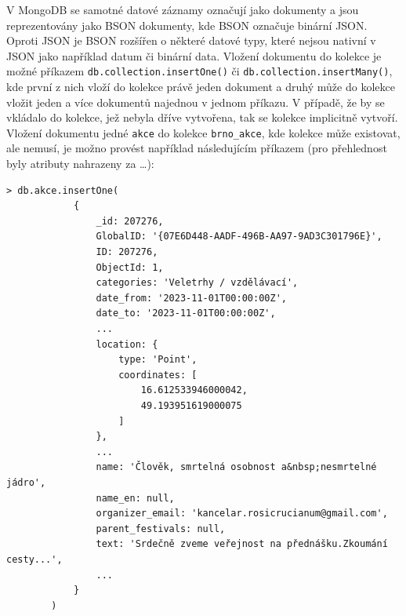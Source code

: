 \documentclass[a4paper, 11pt]{article}
\begin{document}
    V MongoDB se samotné datové záznamy označují jako dokumenty a jsou reprezentovány jako BSON dokumenty, kde BSON označuje binární JSON. Oproti JSON je BSON rozšířen o některé datové typy, které nejsou nativní v JSON jako například datum či binární data. Vložení dokumentu do kolekce je možné příkazem \texttt{db.collection.insertOne()} či \texttt{db.collection.insertMany()}, kde první z nich vloží do kolekce právě jeden dokument a druhý může do kolekce vložit jeden a více dokumentů najednou v jednom příkazu. V případě, že by se vkládalo do kolekce, jež nebyla dříve vytvořena, tak se kolekce implicitně vytvoří. Vložení dokumentu jedné \texttt{akce} do kolekce \texttt{brno\_akce}, kde kolekce může existovat, ale nemusí, je možno provést například následujícím příkazem (pro přehlednost byly atributy nahrazeny za \dots):
    \begin{lstlisting}[style=NoSQL, framesep=10pt]
        > db.akce.insertOne(
            {
                _id: 207276,
                GlobalID: '{07E6D448-AADF-496B-AA97-9AD3C301796E}',
                ID: 207276,
                ObjectId: 1,
                categories: 'Veletrhy / vzdělávací',
                date_from: '2023-11-01T00:00:00Z',
                date_to: '2023-11-01T00:00:00Z',
                ...
                location: {
                    type: 'Point',
                    coordinates: [
                        16.612533946000042,
                        49.193951619000075
                    ]
                },
                ...
                name: 'Člověk, smrtelná osobnost a&nbsp;nesmrtelné jádro',
                name_en: null,
                organizer_email: 'kancelar.rosicrucianum@gmail.com',
                parent_festivals: null,
                text: 'Srdečně zveme veřejnost na přednášku.Zkoumání cesty...',
                ...
            }
        )
    \end{lstlisting}
\end{document}
